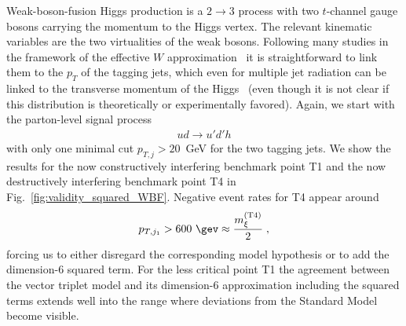 Weak-boson-fusion Higgs production is a $2 \to 3$ process with two
$t$-channel gauge bosons carrying the momentum to the Higgs vertex.
The relevant kinematic variables are the two virtualities of the weak
bosons. Following many studies in the framework of the effective $W$
approximation~\cite{effective_w,polarized_ww} it is straightforward to
link them to the $p_T$ of the tagging jets, which even for multiple
jet radiation can be linked to the transverse momentum of the
Higgs~\cite{Buschmann:2014twa} (even though it is not clear if this
distribution is theoretically or experimentally favored).  Again, we
start with the parton-level signal process
%
\begin{align}
u d \to u' d' h
\label{eq:def_wbf}
\end{align}
%
with only one minimal cut $p_{T,j} > 20$~GeV for the two tagging jets.  We
show the results for the now constructively interfering benchmark
point T1 and the now destructively interfering benchmark point T4 in
Fig.~\ref{fig:validity_squared_WBF}. Negative event rates for T4 appear around
%
\begin{align}
p_{T,j_1} > 600~\gev \approx \frac{m_\xi^\text{(T4)}}{2} \; , 
\label{eq:breakdown_wbf}
\end{align}
%
forcing us to either disregard the corresponding model hypothesis or
to add the dimension-6 squared term.  For the less critical point T1
the agreement between the vector triplet model and its dimension-6
approximation including the squared terms extends well into the range
where deviations from the Standard Model become visible.

